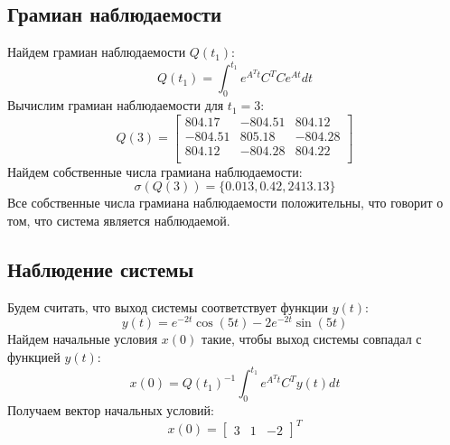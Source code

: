 \subsection{Грамиан наблюдаемости}
Найдем грамиан наблюдаемости $Q(t_1)$:
\begin{equation}
    Q(t_1) = \int_0^{t_1} e^{A^Tt}C^TCe^{At}dt
\end{equation}
Вычислим грамиан наблюдаемости для $t_1 = 3$:
\begin{equation}
    Q(3) = \begin{bmatrix}
        804.17  & -804.51  & 804.12 \\ 
        -804.51  & 805.18  & -804.28 \\ 
        804.12  & -804.28  & 804.22 \\ 
        \end{bmatrix}
\end{equation}
Найдем собственные числа грамиана наблюдаемости:
\begin{equation}
    \sigma(Q(3)) = \{0.013, 0.42, 2413.13\}
\end{equation}
Все собственные числа грамиана наблюдаемости положительны, что говорит о том, что система является наблюдаемой.

\subsection{Наблюдение системы}
Будем считать, что выход системы соответствует функции $y(t)$:
\begin{equation}
    y(t) = e^{-2t} \cos(5t) -2e^{-2t} \sin(5t) 
\end{equation}
Найдем начальные условия $x(0)$ такие, чтобы выход системы совпадал с функцией $y(t)$:
\begin{equation}
    x(0) = Q(t_1)^{-1} \int_0^{t_1} e^{A^Tt}C^Ty(t)dt
\end{equation}
Получаем вектор начальных условий:
\begin{equation}
    x(0) = \begin{bmatrix}
        3 & 1 & -2
    \end{bmatrix}^T
\end{equation}

